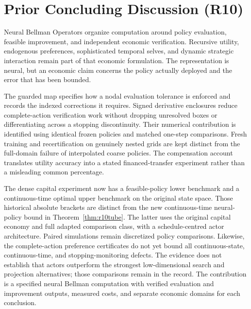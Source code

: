 \section{Prior Concluding Discussion (R10)}
Neural Bellman Operators organize computation around policy evaluation, feasible improvement, and independent economic verification. Recursive utility, endogenous preferences, sophisticated temporal selves, and dynamic strategic interaction remain part of that economic formulation. The representation is neural, but an economic claim concerns the policy actually deployed and the error that has been bounded.

The guarded map specifies how a nodal evaluation tolerance is enforced and records the indexed corrections it requires. Signed derivative enclosures reduce complete-action verification work without dropping unresolved boxes or differentiating across a stopping discontinuity. Their numerical contribution is identified using identical frozen policies and matched one-step comparisons. Fresh training and recertification on genuinely nested grids are kept distinct from the full-domain failure of interpolated coarse policies. The compensation account translates utility accuracy into a stated financed-transfer experiment rather than a misleading common percentage.

The dense capital experiment now has a feasible-policy lower benchmark and a continuous-time optimal upper benchmark on the original state space. Those historical absolute brackets are distinct from the new continuous-time neural-policy bound in Theorem~\ref{thm:r10tube}. The latter uses the original capital economy and full adapted comparison class, with a schedule-centred actor architecture. Paired simulations remain discretized policy comparisons. Likewise, the complete-action preference certificates do not yet bound all continuous-state, continuous-time, and stopping-monitoring defects. The evidence does not establish that actors outperform the strongest low-dimensional search and projection alternatives; those comparisons remain in the record. The contribution is a specified neural Bellman computation with verified evaluation and improvement outputs, measured costs, and separate economic domains for each conclusion.


